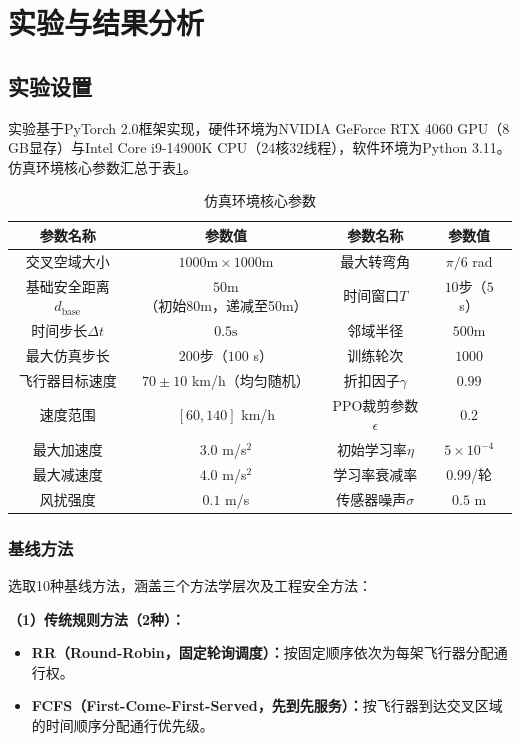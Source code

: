 \documentclass[12pt,a4paper,UTF8]{ctexart}
\begin{document}
\section{实验与结果分析}

\subsection{实验设置}

实验基于PyTorch 2.0框架实现，硬件环境为NVIDIA GeForce RTX 4060 GPU（8 GB显存）与Intel Core i9-14900K CPU（24核32线程），软件环境为Python 3.11。仿真环境核心参数汇总于表\ref{tab:env_params}。

\begin{table}[H]
    \centering
    \small
    \caption{仿真环境核心参数}
    \label{tab:env_params}
    \begin{tabular}{|c|c|c|c|}
        \hline
        \textbf{参数名称} & \textbf{参数值} & \textbf{参数名称} & \textbf{参数值} \\
        \hline
        交叉空域大小 & $1000\text{m} \times 1000\text{m}$ & 最大转弯角 & $\pi/6$ rad \\
        基础安全距离$d_{\text{base}}$ & $50\text{m}$（初始80m，递减至50m） & 时间窗口$T$ & $10$步（$5$ s） \\
        时间步长$\Delta t$ & $0.5\text{s}$ & 邻域半径 & $500\text{m}$ \\
        最大仿真步长 & $200$步（$100$ s） & 训练轮次 & $1000$ \\
        飞行器目标速度 & $70 \pm 10$ km/h（均匀随机） & 折扣因子$\gamma$ & $0.99$ \\
        速度范围 & $[60, 140]$ km/h & PPO裁剪参数$\epsilon$ & $0.2$ \\
        最大加速度 & $3.0$ m/s$^2$ & 初始学习率$\eta$ & $5 \times 10^{-4}$ \\
        最大减速度 & $4.0$ m/s$^2$ & 学习率衰减率 & $0.99$/轮 \\
        风扰强度 & $0.1$ m/s & 传感器噪声$\sigma$ & $0.5$ m \\
        \hline
    \end{tabular}
\end{table}

\subsubsection{基线方法}

选取10种基线方法，涵盖三个方法学层次及工程安全方法：

\textbf{（1）传统规则方法（2种）：}
\begin{itemize}
    \item \textbf{RR（Round-Robin，固定轮询调度）：}按固定顺序依次为每架飞行器分配通行权。
    \item \textbf{FCFS（First-Come-First-Served，先到先服务）：}按飞行器到达交叉区域的时间顺序分配通行优先级。
\end{itemize}
\end{document}
